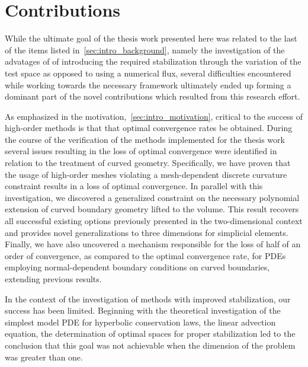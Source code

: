 \section{Contributions}
While the ultimate goal of the thesis work presented here
was related to the last of the items listed in~\autoref{sec:intro_background}, namely the investigation of
the advatages of of introducing the required stabilization through the variation
of the test space as opposed to using a numerical flux,
several difficulties encountered while working towards the necessary
framework ultimately ended up forming a dominant part of the novel contributions
which resulted from this research effort.

As emphasized in the motivation,~\autoref{sec:intro_motivation}, critical to the
success of high-order methods is that that optimal
convergence rates be obtained.
During the course of the verification of the methods implemented for
the thesis work several issues resulting in the loss of optimal convergence were
identified in relation to the treatment of curved geometry.
Specifically, we have proven that the usage of high-order meshes violating a
mesh-dependent discrete curvature constraint results in a loss of optimal
convergence.
In parallel with this investigation, we discovered a generalized
constraint on the necessary polynomial extension of curved boundary geometry lifted
to the volume.
This result recovers all successful existing options previously
presented in the two-dimensional context and provides novel generalizations to
three dimensions for simplicial elements.
Finally, we have also uncovered a mechanism responsible for
the loss of half of an order of convergence, as compared to the optimal
convergence rate, for PDEs employing normal-dependent boundary conditions on
curved boundaries, extending previous results.


 In the context of the investigation of
methods with improved stabilization, our success has been limited. Beginning
with the theoretical investigation of the simplest model PDE for hyperbolic
conservation laws, the linear advection equation, the determination of optimal
spaces for proper stabilization led to the conclusion that this goal was not
achievable when the dimension of the problem was greater than one.

